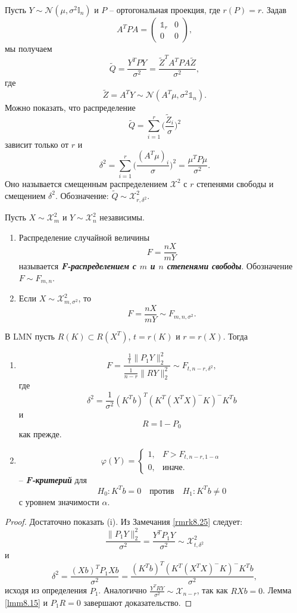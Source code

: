 \begin{rmrk} \label{rmrk8.25}
	Пусть $Y \sim \mathcal{N}(\mu,\sigma^2 \mathbb{I}_n)$ и $P$ -- ортогональная проекция, где $r(P) = r$. Задав
	\[ A^TPA = \begin{pmatrix}
	\mathds{1}_r & 0 \\
	0 & 0
	\end{pmatrix},  \]
	мы получаем
	\[\widetilde{Q} = \frac{Y^TPY}{\sigma^2} = \frac{\widetilde{Z}^TA^TPA\widetilde{Z}}{\sigma^2},\]
	где
	\[ \widetilde{Z} = A^TY \sim \mathcal{N}(A^T\mu, \sigma^2\mathds{1}_n). \]
	Можно показать, что распределение
	\[ \widetilde{Q} = \sum_{i=1}^r \Big( \frac{\widetilde{Z}_i}{\sigma} \Big)^2  \]
	зависит только от $r$ и
	\[ \delta^2 = \sum_{i=1}^r \Big( \frac{(A^T\mu)_i}{\sigma} \Big)^2 = \frac{\mu^T P \mu}{\sigma^2}. \]
	Оно называется смещенным распределением $\mathcal{X}^2$ с $r$ степенями свободы и смещением $\delta^2$. Обозначение: $\widetilde{Q} \sim \mathcal{X}_{r, \delta^2}^2$.
\end{rmrk}

\begin{defn}
	Пусть $X \sim \mathcal{X}_m^2$ и $Y \sim \mathcal{X}_n^2$ независимы. 
	\begin{enumerate}
		\item Распределение случайной величины
		\[ F = \frac{nX}{mY} \]
		называется \textbf{\textit{F-распределением с $m$ и $n$ степенями свободы}}. Обозначение $F \sim F_{m,n}$.
		\item Если $X \sim \mathcal{X}_{m, \sigma^2}^2$, то
		\[ F = \frac{nX}{mY} \sim F_{m,n,\sigma^2}. \]
	\end{enumerate}
\end{defn}

\begin{thm}
	В LMN пусть $R(K) \subset R(X^T)$, $t = r(K)$ и $r = r(X)$. Тогда
	\begin{enumerate}
		\item  \[ F = \frac{\frac{1}{t}\|P_1Y \|_2^2}{\frac{1}{n-r}\| RY \|_2^2} \sim F_{t, n-r, \delta^2}, \]
		где 
		\[\delta^2 = \frac{1}{\sigma^2} (K^Tb)^T(K^T(X^TX)^-K)^-K^Tb \]
	    и
	    \[ R = \mathbb{I} - P_0 \]
	    как прежде.
	    \item
	    \[ \varphi(Y) =
	    \left \{
	    \begin{array}{cl}
	    1, &  F >  F_{t, n-r, 1-\alpha}\\
	    0, & \text{иначе}. 
	    \end{array}
	    \right.
	    \]
	    -- \textbf{\textit{F-критерий}} для
	    \[ H_0: K^Tb = 0 \quad \text{против} \quad H_1: K^Tb \neq 0  \]
	    с уровнем значимости $\alpha$.
	\end{enumerate}
\end{thm}
\begin{proof}
	Достаточно показать (i). Из Замечания \ref{rmrk8.25} следует:
	\[ \frac{\| P_1Y \|_2^2}{\sigma^2} = \frac{Y^TP_1Y}{\sigma^2} \sim \mathcal{X}_{t, \delta^2}^2 \]
	и
	\[ \delta^2 = \frac{(Xb)^TP_1Xb}{\sigma^2} = \frac{(K^Tb)^T (K^T(X^TX)^-K)^-K^Tb}{\sigma^2}, \]
	исходя из определения $P_1$. Аналогично $\frac{Y^TRY}{\sigma^2} \sim \mathcal{X}_{n-r}$, так как $RXb = 0$. Лемма \ref{lmm8.15} и $P_1R=0$ завершают доказательство.
\end{proof}